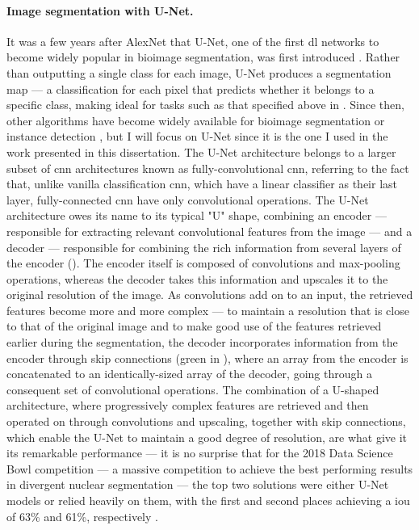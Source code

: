 \paragraph{Image segmentation with U-Net.} It was a few years after AlexNet that U-Net, one of the first \ac{dl} networks to become widely popular in bioimage segmentation, was first introduced \cite{Ronneberger2015-do}. Rather than outputting a single class for each image, U-Net produces a segmentation map --- a classification for each pixel that predicts whether it belongs to a specific class, making ideal for tasks such as that specified above in . Since then, other algorithms have become widely available for bioimage segmentation or instance detection \cite{Lucas2021-hc}, but I will focus on U-Net since it is the one I used in the work presented in this dissertation. The U-Net architecture belongs to a larger subset of \ac{cnn} architectures known as fully-convolutional \ac{cnn}, referring to the fact that, unlike vanilla classification \ac{cnn}, which have a linear classifier as their last layer, fully-connected \ac{cnn} have only convolutional operations. The U-Net architecture owes its name to its typical "U" shape, combining an encoder --- responsible for extracting relevant convolutional features from the image --- and a decoder --- responsible for combining the rich information from several layers of the encoder (). The encoder itself is composed of convolutions and max-pooling operations, whereas the decoder takes this information and upscales it to the original resolution of the image. As convolutions add on to an input, the retrieved features become more and more complex --- to maintain a resolution that is close to that of the original image and to make good use of the features retrieved earlier during the segmentation, the decoder incorporates information from the encoder through skip connections (green in ), where an array from the encoder is concatenated to an identically-sized array of the decoder, going through a consequent set of convolutional operations. The combination of a U-shaped architecture, where progressively complex features are retrieved and then operated on through convolutions and upscaling, together with skip connections, which enable the U-Net to maintain a good degree of resolution, are what give it its remarkable performance --- it is no surprise that for the 2018 Data Science Bowl competition --- a massive competition to achieve the best performing results in divergent nuclear segmentation --- the top two solutions were either U-Net models or relied heavily on them, with the first and second places achieving a \ac{iou} of 63\% and 61\%, respectively \cite{Seferbekov_undated-br,jacobkie_undated-tc}. 

